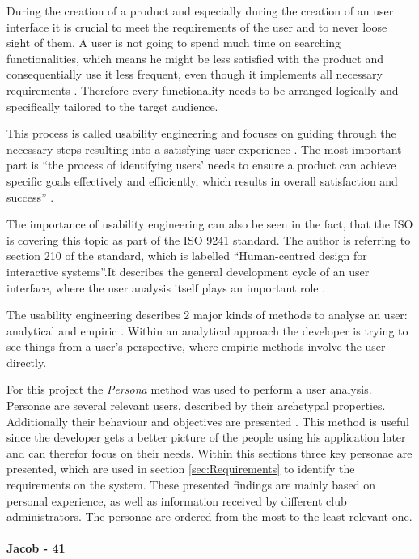 During the creation of a product and especially during the creation of an user interface it is crucial to meet the requirements of the user and to never loose sight of them. A user is not going to spend much time on searching functionalities, which means he might be less satisfied with the product and consequentially use it less frequent, even though it implements all necessary requirements \cite{Frank:2013aa}. Therefore every functionality needs to be arranged logically and specifically tailored to the target audience.

This process is called usability engineering and focuses on guiding through the necessary steps resulting into a satisfying user experience \cite{Nielsen:1993aa}. The most important part is \enquote{the process of identifying users’ needs to ensure a product can achieve specific goals effectively and efficiently, which results in overall satisfaction and success} \cite{Frank:2013aa}.

The importance of usability engineering can also be seen in the fact, that the \gls{ISO} is covering this topic as part of the ISO 9241 standard. The author is referring to section 210 of the standard, which is labelled \enquote{Human-centred design for interactive systems}.It describes the general development cycle of an user interface, where the user analysis itself plays an important role \cite[p. 13]{Gulzow:2015aa}.

The usability engineering describes 2 major kinds of methods to analyse an user: analytical and empiric \cite[p. 20]{Gulzow:2015aa}. Within an analytical approach the developer is trying to see things from a user's perspective, where empiric methods involve the user directly. 

For this project the \emph{Persona} method was used to perform a user analysis. Personae are several relevant users, described by their archetypal properties. Additionally their behaviour and objectives are presented \cite[p. 30]{Gulzow:2015aa}. This method is useful since the developer gets a better picture of the people using his application later and can therefor focus on their needs. Within this sections three key personae are presented, which are used in section \vref{sec:Requirements} to identify the requirements on the system. These presented findings are mainly based on personal experience, as well as information received by different club administrators. The personae are ordered from the most to the least relevant one.

\paragraph{Jacob - 41}
\label{sec:Jacob}

